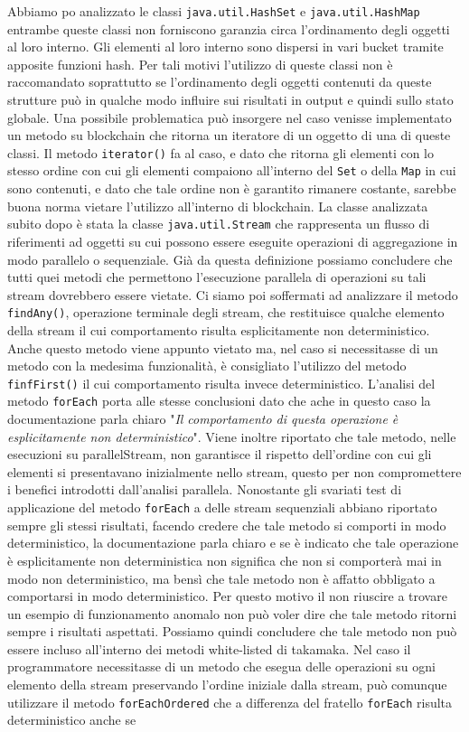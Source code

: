 Abbiamo po analizzato le classi \lstinline|java.util.HashSet| e \lstinline|java.util.HashMap| entrambe queste classi non forniscono garanzia circa l'ordinamento degli oggetti al loro interno. Gli elementi al loro interno sono dispersi in vari bucket tramite apposite funzioni hash. Per tali motivi l'utilizzo di queste classi non è raccomandato soprattutto se l'ordinamento degli oggetti contenuti da queste strutture può in qualche modo influire sui risultati in output e quindi sullo stato globale. Una possibile problematica può insorgere nel caso venisse implementato un metodo su blockchain che ritorna un iteratore di un oggetto di una di queste classi. Il metodo \lstinline|iterator()| fa al caso, e dato che ritorna gli elementi con lo stesso ordine con cui gli elementi compaiono all'interno del \lstinline|Set| o della \lstinline|Map| in cui sono contenuti, e dato che tale ordine non è garantito rimanere costante, sarebbe buona norma vietare l'utilizzo all'interno di blockchain. La classe analizzata subito dopo è stata la classe \lstinline|java.util.Stream| che rappresenta un flusso di riferimenti ad oggetti su cui possono essere eseguite operazioni di aggregazione in modo parallelo o sequenziale. Già da questa definizione possiamo concludere che tutti quei metodi che permettono l'esecuzione parallela di operazioni su tali stream dovrebbero essere vietate. Ci siamo poi soffermati ad analizzare il metodo \lstinline|findAny()|, operazione terminale degli stream, che restituisce qualche elemento della stream il cui comportamento risulta esplicitamente non deterministico. Anche questo metodo viene appunto vietato ma, nel caso si necessitasse di un metodo con la medesima funzionalità, è consigliato l'utilizzo del metodo \lstinline|finfFirst()| il cui comportamento risulta invece deterministico. L'analisi del metodo \lstinline|forEach| porta alle stesse conclusioni dato che ache in questo caso la documentazione parla chiaro "\textit{Il comportamento di questa operazione è esplicitamente non deterministico}". Viene inoltre riportato che tale metodo, nelle esecuzioni su parallelStream, non garantisce il rispetto dell'ordine con cui gli elementi si presentavano inizialmente nello stream, questo per non compromettere i benefici introdotti dall'analisi parallela. Nonostante gli svariati test di applicazione del metodo \lstinline|forEach| a delle stream sequenziali abbiano riportato sempre gli stessi risultati, facendo credere che tale metodo si comporti in modo deterministico, la documentazione parla chiaro e se è indicato che tale operazione è esplicitamente non deterministica non significa che non si comporterà mai in modo non deterministico, ma bensì che tale metodo non è affatto obbligato a comportarsi in modo deterministico. Per questo motivo il non riuscire a trovare un esempio di funzionamento anomalo non può voler dire che tale metodo ritorni sempre i risultati aspettati. Possiamo quindi concludere che tale metodo non può essere incluso all'interno dei metodi white-listed di takamaka. Nel caso il programmatore necessitasse di un metodo che esegua delle operazioni su ogni elemento della stream preservando l'ordine iniziale dalla stream, può comunque utilizzare il metodo \lstinline|forEachOrdered| che a differenza del fratello \lstinline|forEach| risulta deterministico anche se 
